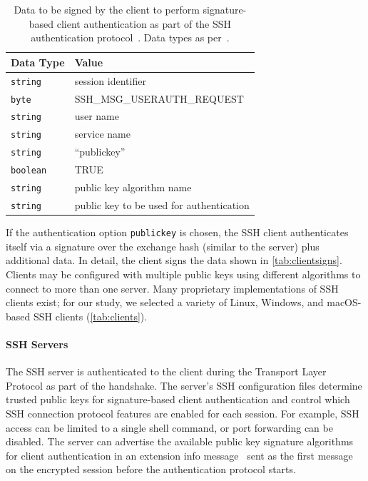 \begin{table}
    \centering
    \caption{Data to be signed by the client to perform signature-based client authentication as part of the SSH authentication protocol~\cite[Section 7]{rfc4252}. Data types as per~\cite[Section 5]{rfc4251}.}
    \label{tab:clientsigns}
    \begin{tabular}{ll}
        \toprule
        Data Type        &  Value \\ \midrule
        \texttt{string}  &  session identifier \\
        \texttt{byte}    &  SSH\_MSG\_USERAUTH\_REQUEST\\
        \texttt{string}  &  user name\\
        \texttt{string}  &  service name\\
        \texttt{string}  &  ``publickey''\\
        \texttt{boolean} &  TRUE\\
        \texttt{string}  &  public key algorithm name\\
        \texttt{string}  &  public key to be used for authentication \\
        \bottomrule
    \end{tabular}
\end{table}

If the authentication option \verb|publickey| is chosen, the SSH client authenticates itself via a signature over the exchange hash (similar to the server) plus additional data. In detail, the client signs the data shown in \autoref{tab:clientsigns}. Clients may be configured with multiple public keys using different algorithms to connect to more than one server. Many proprietary implementations of SSH clients exist; for our study, we selected a variety of Linux, Windows, and macOS-based SSH clients (\autoref{tab:clients}).

\paragraph{SSH Servers}

The SSH server is authenticated to the client during the Transport Layer Protocol as part of the handshake. The server's SSH configuration files determine trusted public keys for signature-based client authentication and control which SSH connection protocol features are enabled for each session. For example, SSH access can be limited to a single shell command, or port forwarding can be disabled. The server can advertise the available public key signature algorithms for client authentication in an extension info message~\cite{rfc8308} sent as the first message on the encrypted session before the authentication protocol starts.

